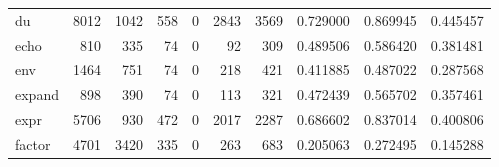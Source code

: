 \begin{tabular}{lrrrrrrrrr}
du        &                                8012 &                                            1042 &                                            558 &                                             0 &                                           2843 &                                         3569 &                                           0.729000 &                               0.869945 &                             0.445457 \\
echo      &                                 810 &                                             335 &                                             74 &                                             0 &                                             92 &                                          309 &                                           0.489506 &                               0.586420 &                             0.381481 \\
env       &                                1464 &                                             751 &                                             74 &                                             0 &                                            218 &                                          421 &                                           0.411885 &                               0.487022 &                             0.287568 \\
expand    &                                 898 &                                             390 &                                             74 &                                             0 &                                            113 &                                          321 &                                           0.472439 &                               0.565702 &                             0.357461 \\
expr      &                                5706 &                                             930 &                                            472 &                                             0 &                                           2017 &                                         2287 &                                           0.686602 &                               0.837014 &                             0.400806 \\
factor    &                                4701 &                                            3420 &                                            335 &                                             0 &                                            263 &                                          683 &                                           0.205063 &                               0.272495 &                             0.145288 \\

\end{tabular}
